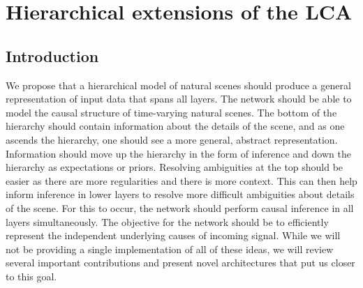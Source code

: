 \chapter{Hierarchical extensions of the LCA}\label{ch:hierarchical_sc}

\section{Introduction}\label{sec:ch3_intro}
We propose that a hierarchical model of natural scenes should produce a general representation of input data that spans all layers. The network should be able to model the causal structure of time-varying natural scenes. The bottom of the hierarchy should contain information about the details of the scene, and as one ascends the hierarchy, one should see a more general, abstract representation. Information should move up the hierarchy in the form of inference and down the hierarchy as expectations or priors. Resolving ambiguities at the top should be easier as there are more regularities and there is more context. This can then help inform inference in lower layers to resolve more difficult ambiguities about details of the scene. For this to occur, the network should perform causal inference in all layers simultaneously. The objective for the network should be to efficiently represent the independent underlying causes of incoming signal. While we will not be providing a single implementation of all of these ideas, we will review several important contributions and present novel architectures that put us closer to this goal.


